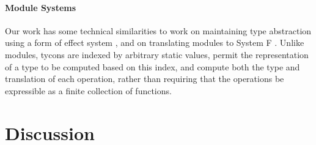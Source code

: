\documentclass[10pt,preprint]{sigplanconf}
\begin{document}
\paragraph{Module Systems}
Our work has some technical similarities to work on maintaining type abstraction using a form of effect system \cite{CraryHarperDreyer2002}, and on translating modules to System F \cite{conf/tldi/RossbergRD10}. Unlike modules, tycons are indexed by arbitrary static values, permit the representation of a type to be computed based on this index, and compute both the type and translation of each operation, rather than requiring that the operations be expressible as a finite collection of functions.%

\section{Discussion}\label{discussion}

\end{document}
